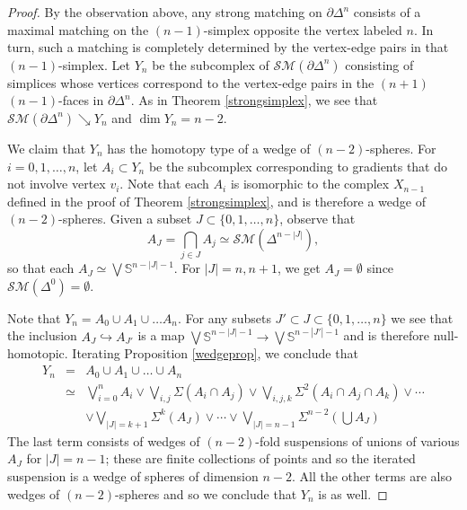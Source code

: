 \documentclass{amsart}
\theoremstyle{definition}
\newcommand{\zs}{{\mathbb S}}
\newcommand{\sm}{{\mathcal{SM}}}
\begin{document}
\begin{proof}
    By the observation above, any strong matching on $\partial\Delta^n$ consists of a maximal matching on the $(n-1)$-simplex opposite the vertex labeled $n$. In turn, such a matching is completely determined by the vertex-edge pairs in that $(n-1)$-simplex. Let $Y_n$ be the subcomplex of $\sm(\partial\Delta^n)$ consisting of simplices whose vertices correspond to the vertex-edge pairs in the $(n+1)$ $(n-1)$-faces in $\partial\Delta^n$. As in Theorem \ref{strongsimplex}, we see that $\sm(\partial\Delta^n)\searrow Y_n$ and $\dim Y_n=n-2$.

    We claim that $Y_n$ has the homotopy type of a wedge of $(n-2)$-spheres. For $i=0,1,\dots,n$, let $A_i\subset Y_n$ be the subcomplex corresponding to gradients that do not involve vertex $v_i$. Note that each $A_i$ is isomorphic to the complex $X_{n-1}$ defined in the proof of Theorem \ref{strongsimplex}, and is therefore a wedge of $(n-2)$-spheres. Given a subset $J\subset\{0,1,\dots,n\}$, observe that
    $$A_J = \bigcap_{j\in J}A_j \simeq \sm(\Delta^{n-|J|}),$$
    so that each $A_J\simeq \bigvee \zs^{n-|J|-1}$. For $|J|=n,n+1$, we get $A_J=\emptyset$ since $\sm(\Delta^0)=\emptyset$. 
    
    Note that $Y_n=A_0\cup A_1\cup\dots A_n$. For any subsets $J'\subset J\subset \{0,1,\dots,n\}$ we see that the inclusion $A_{J}\hookrightarrow A_{J'}$ is a map $\bigvee \zs^{n-|J|-1} \to \bigvee \zs^{n-|J'|-1}$ and is therefore null-homotopic. Iterating Proposition \ref{wedgeprop}, we conclude that
    \begin{eqnarray*}
        Y_n & = & A_0\cup A_1\cup\dots\cup A_n \\
         & \simeq & \bigvee_{i=0}^n A_i \vee \bigvee_{i,j}\Sigma(A_i\cap A_j) \vee \bigvee_{i,j,k}\Sigma^2(A_i\cap A_j\cap A_k) \vee \cdots \\
         &  &  \vee \bigvee_{|J|=k+1}\Sigma^k(A_J)\vee \cdots \vee \bigvee_{|J|=n-1} \Sigma^{n-2}(\bigcup A_J)
    \end{eqnarray*}
    The last term consists of wedges of $(n-2)$-fold suspensions of unions of various $A_J$ for $|J|=n-1$; these are finite collections of points and so the iterated suspension is a wedge of spheres of dimension $n-2$. All the other terms are also wedges of $(n-2)$-spheres and so we conclude that $Y_n$ is as well.


\end{proof}
\end{document}
